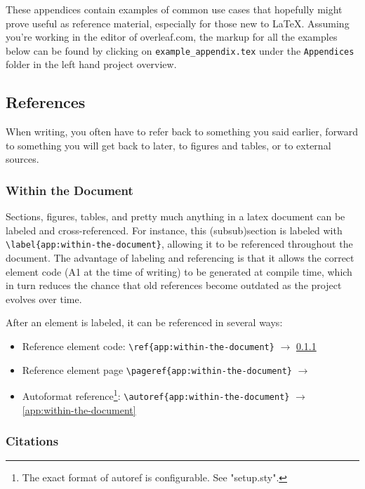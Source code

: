 
These appendices contain examples of common use cases that hopefully might prove useful as reference material, especially for those new to LaTeX.
Assuming you're working in the editor of overleaf.com, the markup for all the examples below can be found by clicking on \verb|example_appendix.tex| under the \verb|Appendices| folder in the left hand project overview.


\subsection{References}


When writing, you often have to refer back to something you said earlier, forward to something you will get back to later, to figures and tables, or to external sources.

\subsubsection{Within the Document}
\label{app:within-the-document}

Sections, figures, tables, and pretty much anything in a latex document can be labeled and cross-referenced.
For instance, this (subsub)section is labeled with \verb|\label{app:within-the-document}|, allowing it to be referenced throughout the document.
The advantage of labeling and referencing is that it allows the correct element code (A1 at the time of writing) to be generated at compile time, which in turn reduces the chance that old references become outdated as the project evolves over time.

After an element is labeled, it can be referenced in several ways:

\begin{itemize}
    \item Reference element code: \verb|\ref{app:within-the-document}| $\rightarrow$ \ref{app:within-the-document} 
    \item Reference element page \verb|\pageref{app:within-the-document}| $\rightarrow$ \pageref{app:within-the-document}
    \item Autoformat reference\footnote{The exact format of autoref is configurable. See "setup.sty".}: \verb|\autoref{app:within-the-document}| $\rightarrow$ \autoref{app:within-the-document}
\end{itemize}

\subsubsection{Citations}

